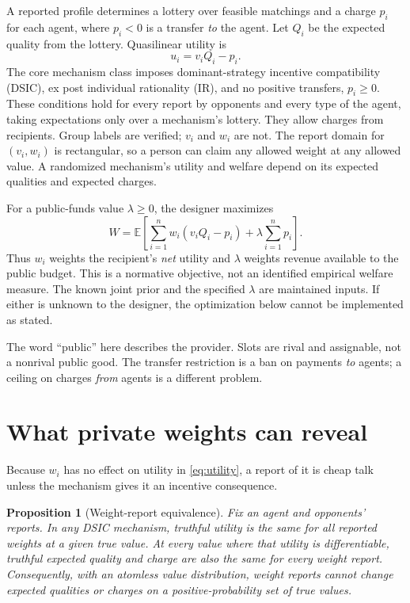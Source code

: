 \documentclass[11pt]{article}
\newtheorem{proposition}{Proposition}
\newcommand{\E}{\mathbb E}
\begin{document}
A reported profile determines a lottery over feasible matchings and a charge $p_i$ for each agent, where $p_i<0$ is a transfer \emph{to} the agent. Let $Q_i$ be the expected quality from the lottery. Quasilinear utility is
\begin{equation}\label{eq:utility}
u_i=v_iQ_i-p_i.
\end{equation}
The core mechanism class imposes dominant-strategy incentive compatibility (DSIC), ex post individual rationality (IR), and no positive transfers, $p_i\ge0$. These conditions hold for every report by opponents and every type of the agent, taking expectations only over a mechanism's lottery. They allow charges from recipients. Group labels are verified; $v_i$ and $w_i$ are not. The report domain for $(v_i,w_i)$ is rectangular, so a person can claim any allowed weight at any allowed value. A randomized mechanism's utility and welfare depend on its expected qualities and expected charges.

For a public-funds value $\lambda\ge0$, the designer maximizes
\begin{equation}\label{eq:objective}
W=\E\!\left[\sum_{i=1}^n w_i(v_iQ_i-p_i)+\lambda\sum_{i=1}^n p_i\right].
\end{equation}
Thus $w_i$ weights the recipient's \emph{net} utility and $\lambda$ weights revenue available to the public budget. This is a normative objective, not an identified empirical welfare measure. The known joint prior and the specified $\lambda$ are maintained inputs. If either is unknown to the designer, the optimization below cannot be implemented as stated.

The word ``public'' here describes the provider. Slots are rival and assignable, not a nonrival public good. The transfer restriction is a ban on payments \emph{to} agents; a ceiling on charges \emph{from} agents is a different problem.

\section{What private weights can reveal}\label{sec:weights}

Because $w_i$ has no effect on utility in \eqref{eq:utility}, a report of it is cheap talk unless the mechanism gives it an incentive consequence.

\begin{proposition}[Weight-report equivalence]\label{prop:weights}
Fix an agent and opponents' reports. In any DSIC mechanism, truthful utility is the same for all reported weights at a given true value. At every value where that utility is differentiable, truthful expected quality and charge are also the same for every weight report. Consequently, with an atomless value distribution, weight reports cannot change expected qualities or charges on a positive-probability set of true values.
\end{proposition}
\end{document}
